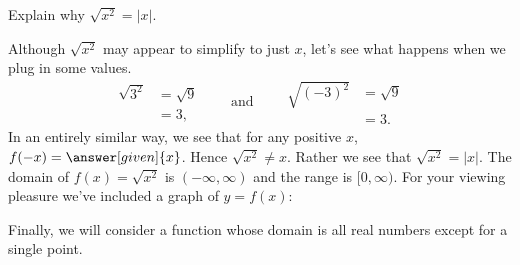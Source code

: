 \documentclass{ximera}
\begin{document}
\begin{example}
  Explain why $\sqrt{x^2} = |x|$.
  \begin{explanation}
    Although $\sqrt{x^2}$ may appear to simplify to just $x$, let's see
    what happens when we plug in some values.
    \[
    \begin{aligned}
    \sqrt{3^2} &= \sqrt{9}\\
    &=3,
    \end{aligned}
    \qquad\text{and}\qquad
    \begin{aligned}
      \sqrt{(-3)^2} &= \sqrt{9}\\
      &=3.
    \end{aligned}
    \]
    In an entirely similar way, we see that for any positive $x$, $f(-x)=\answer[given]{x}$.  Hence
    $\sqrt{x^2}\ne x$. Rather we see that $\sqrt{x^2} = |x|$.  The
    domain of $f(x)=\sqrt{x^2}$ is $(-\infty,\infty)$ and the range is
    $[0,\infty)$.  For your viewing pleasure we've included a graph of
      $y=f(x)$:
    \begin{image}
    \end{image}
  \end{explanation}
\end{example}

Finally, we will consider a function whose domain is all real numbers
except for a single point.
\end{document}
